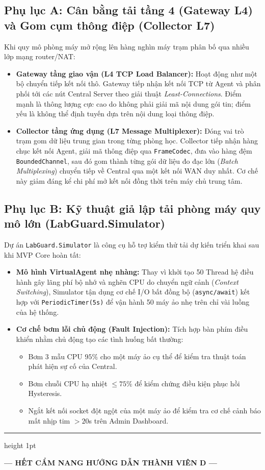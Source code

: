 \documentclass[12pt,a4paper]{article}
\begin{document}
\subsection*{Phụ lục A: Cân bằng tải tầng 4 (Gateway L4) và Gom cụm thông điệp (Collector L7)}
Khi quy mô phòng máy mở rộng lên hàng nghìn máy trạm phân bố qua nhiều lớp mạng router/NAT:
\begin{itemize}
  \item \textbf{Gateway tầng giao vận (L4 TCP Load Balancer):} Hoạt động như một bộ chuyển tiếp kết nối thô. Gateway tiếp nhận kết nối TCP từ Agent và phân phối tới các nút Central Server theo giải thuật \textit{Least-Connections}. Điểm mạnh là thông lượng cực cao do không phải giải mã nội dung gói tin; điểm yếu là không thể định tuyến dựa trên nội dung loại thông điệp.
  \item \textbf{Collector tầng ứng dụng (L7 Message Multiplexer):} Đóng vai trò trạm gom dữ liệu trung gian trong từng phòng học. Collector tiếp nhận hàng chục kết nối Agent, giải mã thông điệp qua \texttt{FrameCodec}, đưa vào hàng đệm \texttt{BoundedChannel}, sau đó gom thành từng gói dữ liệu đo đạc lớn (\textit{Batch Multiplexing}) chuyển tiếp về Central qua một kết nối WAN duy nhất. Cơ chế này giảm đáng kể chi phí mở kết nối đồng thời trên máy chủ trung tâm.
\end{itemize}

\subsection*{Phụ lục B: Kỹ thuật giả lập tải phòng máy quy mô lớn (LabGuard.Simulator)}
Dự án \texttt{LabGuard.Simulator} là công cụ hỗ trợ kiểm thử tải dự kiến triển khai sau khi MVP Core hoàn tất:
\begin{itemize}
  \item \textbf{Mô hình VirtualAgent nhẹ nhàng:} Thay vì khởi tạo 50 Thread hệ điều hành gây lãng phí bộ nhớ và nghẽn CPU do chuyển ngữ cảnh (\textit{Context Switching}), Simulator tận dụng cơ chế I/O bất đồng bộ (\texttt{async/await}) kết hợp với \texttt{PeriodicTimer(5s)} để vận hành 50 máy ảo nhẹ trên chỉ vài luồng của hệ thống.
  \item \textbf{Cơ chế bơm lỗi chủ động (Fault Injection):} Tích hợp bàn phím điều khiển nhằm chủ động tạo các tình huống bất thường:
    \begin{itemize}
      \item Bơm 3 mẫu CPU $95\%$ cho một máy ảo cụ thể để kiểm tra thuật toán phát hiện sự cố của Central.
      \item Bơm chuỗi CPU hạ nhiệt $\le 75\%$ để kiểm chứng điều kiện phục hồi Hysteresis.
      \item Ngắt kết nối socket đột ngột của một máy ảo để kiểm tra cơ chế cảnh báo mất nhịp tim $>20$s trên Admin Dashboard.
    \end{itemize}
\end{itemize}

\begin{center}
  \vspace{10mm}
  {\color{lgDeepBlue}\hrule height 1pt}
  \vspace{4mm}
  {\bfseries\color{lgSlate} — HẾT CẨM NANG HƯỚNG DẪN THÀNH VIÊN D —\par}
\end{center}
\end{document}
